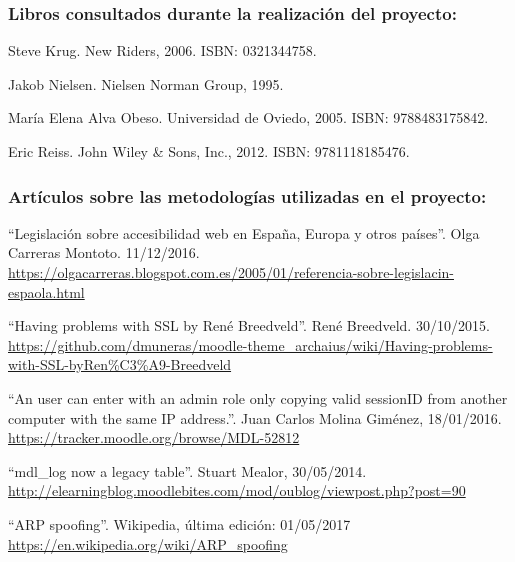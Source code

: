 



\subsubsection*{Libros consultados durante la realización del proyecto:}


Steve Krug.
\newblock New Riders, 2006.
\newblock ISBN: 0321344758.

Jakob Nielsen.
\newblock Nielsen Norman Group, 1995.

María Elena Alva Obeso.
\newblock Universidad de Oviedo, 2005.
\newblock ISBN: 9788483175842.

Eric Reiss.
\newblock John Wiley \& Sons, Inc., 2012.
\newblock ISBN: 9781118185476.


\subsubsection*{Artículos sobre las metodologías utilizadas en el proyecto:}


 ``Legislación sobre accesibilidad web en España, Europa y otros países''. Olga Carreras Montoto. 11/12/2016. \url{https://olgacarreras.blogspot.com.es/2005/01/referencia-sobre-legislacin-espaola.html}

 ``Having problems with SSL by René Breedveld''. René Breedveld. 30/10/2015. \url{https://github.com/dmuneras/moodle-theme_archaius/wiki/Having-problems-with-SSL-byRen\%C3\%A9-Breedveld}

 ``An user can enter with an admin role only copying valid sessionID from another computer with the same IP address.''. Juan Carlos Molina Giménez, 18/01/2016. \url{https://tracker.moodle.org/browse/MDL-52812}

 ``mdl\_log now a legacy table''. Stuart Mealor, 30/05/2014. \url{http://elearningblog.moodlebites.com/mod/oublog/viewpost.php?post=90}

 ``ARP spoofing''. Wikipedia, última edición: 01/05/2017 \url{https://en.wikipedia.org/wiki/ARP_spoofing}

